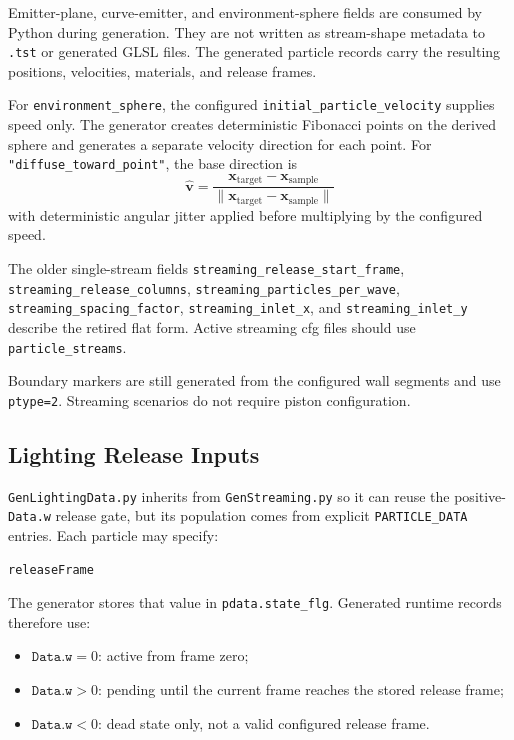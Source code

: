 Emitter-plane, curve-emitter, and environment-sphere fields are consumed by
Python during generation.  They are not written as stream-shape metadata to
\texttt{.tst} or generated GLSL files.  The generated particle records carry
the resulting positions, velocities, materials, and release frames.

For \texttt{environment\_sphere}, the configured
\texttt{initial\_particle\_velocity} supplies speed only.  The generator
creates deterministic Fibonacci points on the derived sphere and generates a
separate velocity direction for each point.  For
\texttt{"diffuse\_toward\_point"}, the base direction is
\[
    \widehat{\mathbf v} =
    \frac{\mathbf x_{\mathrm{target}}-\mathbf x_{\mathrm{sample}}}
         {\lVert\mathbf x_{\mathrm{target}}-\mathbf x_{\mathrm{sample}}\rVert}
\]
with deterministic angular jitter applied before multiplying by the
configured speed.

The older single-stream fields
\texttt{streaming\_release\_start\_frame},
\texttt{streaming\_release\_columns},
\texttt{streaming\_particles\_per\_wave},
\texttt{streaming\_spacing\_factor},
\texttt{streaming\_inlet\_x}, and \texttt{streaming\_inlet\_y} describe the
retired flat form.  Active streaming cfg files should use
\texttt{particle\_streams}.

Boundary markers are still generated from the configured wall segments and use
\texttt{ptype=2}.  Streaming scenarios do not require piston configuration.

\subsection{Lighting Release Inputs}

\texttt{GenLightingData.py} inherits from \texttt{GenStreaming.py} so it can
reuse the positive-\texttt{Data.w} release gate, but its population comes from
explicit \texttt{PARTICLE\_DATA} entries.  Each particle may specify:
\begin{verbatim}
releaseFrame
\end{verbatim}
The generator stores that value in \texttt{pdata.state\_flg}.  Generated
runtime records therefore use:
\begin{itemize}
    \item \(\texttt{Data.w}=0\): active from frame zero;
    \item \(\texttt{Data.w}>0\): pending until the current frame reaches the
          stored release frame;
    \item \(\texttt{Data.w}<0\): dead state only, not a valid configured
          release frame.
\end{itemize}

